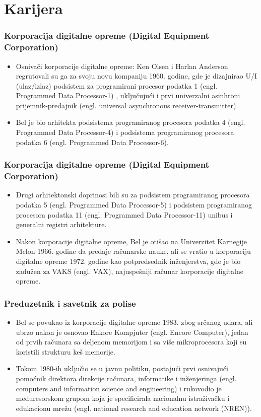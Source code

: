 \documentclass{beamer}
\begin{document}
\section{Karijera}

\begin{frame}[fragile]\frametitle{Korporacija digitalne opreme (Digital Equipment Corporation)}
	\begin{itemize}	
		\item Osnivači korporacije digitalne opreme: Ken Olsen i Harlan Anderson regrutovali su ga za svoju novu kompaniju 1960. godine, gde je dizajnirao U/I (ulaz/izlaz) podsistem za programirani procesor podatka 1 (engl. Programmed Data Processor-1) , uključujući i prvi univerzalni asinhroni prijemnik-predajnik (engl. universal asynchronous receiver-transmitter).
		\item Bel je bio arhitekta podsistema programiranog procesora podatka 4 (engl. Programmed Data Processor-4) i podsistema programiranog procesora podatka 6 (engl. Programmed Data Processor-6). 
	\end{itemize}
\end{frame}
\begin{frame}[fragile]\frametitle{Korporacija digitalne opreme (Digital Equipment Corporation)}
	\begin{itemize}	
		\item Drugi arhitektonski doprinosi bili su za podsistem programiranog procesora podatka 5 (engl. Programmed Data Processor-5) i podsistem programiranog procesora podatka 11 (engl. Programmed Data Processor-11) unibus i generalni registri arhitekture. 
		\item Nakon korporacije digitalne opreme, Bel je otišao na Univerzitet Karnegije Melon 1966. godine da predaje računarske nauke, ali se vratio u korporaciju digitalne opreme 1972. godine kao potpredsednik inženjerstva, gde je bio zadužen za VAKS (engl. VAX), najuspešniji računar korporacije digitalne opreme.
	\end{itemize}
\end{frame}
\begin{frame}[fragile]\frametitle{Preduzetnik i savetnik za polise}
	\begin{itemize}	
		\item Bel se povukao iz korporacije digitalne opreme 1983. zbog srčanog udara, ali ubrzo nakon je osnovao Enkore Kompjuter (engl. Encore Computer), jedan od prvih računara sa deljenom memorijom i sa više mikroprocesora koji su koristili strukturu keš memorije.
		\item Tokom 1980-ih uključio se u javnu politiku, postajući prvi osnivajući pomoćnik direktora direkcije računara, informatike i inženjeringa (engl. computers and information science and engineering) i rukovodio je međuresorskom grupom koja je specificirala nacionalnu istraživačku i edukacionu mrežu (engl. national research and education network (NREN)).
	\end{itemize}
\end{frame}
\end{document}

